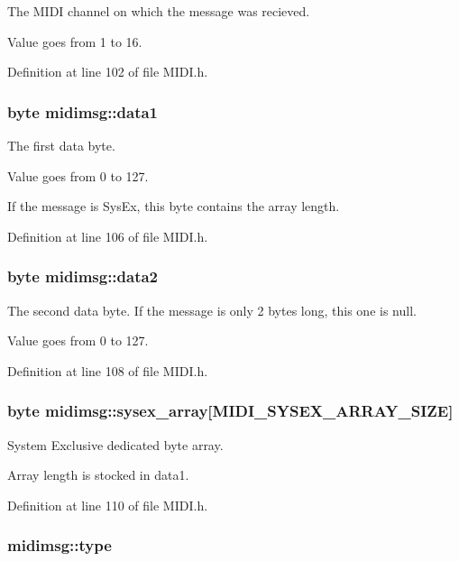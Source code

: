 The MIDI channel on which the message was recieved. \par
 Value goes from 1 to 16. 

Definition at line 102 of file MIDI.h.\hypertarget{structmidimsg_d0a225fbc23de9f631331d6aa52ab981}{
\subsubsection[{data1}]{\setlength{\rightskip}{0pt plus 5cm}byte {\bf midimsg::data1}}}
\label{structmidimsg_d0a225fbc23de9f631331d6aa52ab981}


The first data byte.\par
 Value goes from 0 to 127.\par
 If the message is SysEx, this byte contains the array length. 

Definition at line 106 of file MIDI.h.\hypertarget{structmidimsg_240be209353b132d10757bf345146e6b}{
\subsubsection[{data2}]{\setlength{\rightskip}{0pt plus 5cm}byte {\bf midimsg::data2}}}
\label{structmidimsg_240be209353b132d10757bf345146e6b}


The second data byte. If the message is only 2 bytes long, this one is null.\par
 Value goes from 0 to 127. 

Definition at line 108 of file MIDI.h.\hypertarget{structmidimsg_253df8383f977227e7d45ba488d98601}{
\subsubsection[{sysex\_\-array}]{\setlength{\rightskip}{0pt plus 5cm}byte {\bf midimsg::sysex\_\-array}\mbox{[}MIDI\_\-SYSEX\_\-ARRAY\_\-SIZE\mbox{]}}}
\label{structmidimsg_253df8383f977227e7d45ba488d98601}


System Exclusive dedicated byte array. \par
 Array length is stocked in data1. 

Definition at line 110 of file MIDI.h.\hypertarget{structmidimsg_c2aa51d6154e6434f4426f925c6e5287}{
\subsubsection[{type}]{ {\bf midimsg::type}}}
\label{structmidimsg_c2aa51d6154e6434f4426f925c6e5287}


